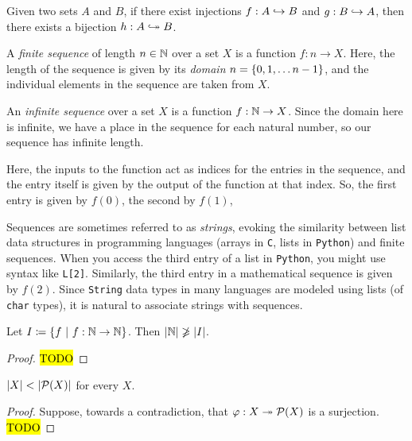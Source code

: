 \begin{theorem}
    Given two sets $A$ and $B$,
    if there exist injections $f: A \hookrightarrow B$ and $g: B \hookrightarrow A$,
    then there exists a bijection $h: A \bijection B$.
\end{theorem}

\begin{definition}[Sequences]
    A \emph{finite sequence} of length $n \in \mathbb{N}$ over a set $X$ is a function $f: n \to X$.
    Here, the length of the sequence is given by its \emph{domain} $n = \set*{0, 1, \dots n - 1}$,
    and the individual elements in the sequence are taken from $X$.

    An \emph{infinite sequence} over a set $X$ is a function $f: \mathbb{N} \to X$.
    Since the domain here is infinite, we have a place in the sequence for each natural number,
    so our sequence has infinite length.

    Here, the inputs to the function act as indices for the entries in the sequence,
    and the entry itself is given by the output of the function at that index.
    So, the first entry is given by $f(0)$, the second by $f(1)$, \etc

    Sequences are sometimes referred to as \emph{strings},
    evoking the similarity between list data structures in programming languages
    (\eg arrays in \texttt{C}, lists in \texttt{Python})
    and finite sequences.
    When you access the third entry of a list in \texttt{Python},
    you might use syntax like \texttt{L[2]}.
    Similarly, the third entry in a mathematical sequence is given by $f(2)$.
    Since \texttt{String} data types in many languages are modeled using lists (\eg of \texttt{char} types),
    it is natural to associate strings with sequences.
\end{definition}

\begin{theorem}
    Let $I \defn \set*{f \suchthat f: \N \to \N}$.
    Then $\lvert\mathbb{N}\rvert \not \geqslant \lvert I\rvert$.
\end{theorem}
\begin{proof}
    \hl{TODO}
\end{proof}

\begin{theorem}
    $\cardinality{X} < \cardinality{\power{X}}$ for every $X$.
\end{theorem}
\begin{proof}
    Suppose, towards a contradiction, that $\varphi: X \surj \power{X}$ is a surjection.
    \hl{TODO}
\end{proof}


